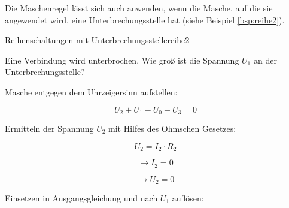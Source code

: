 \begin{frame}
{	Die Maschenregel lässt sich auch anwenden, wenn die Masche, auf die sie angewendet wird, eine Unterbrechungsstelle hat (siehe Beispiel \ref{bsp:reihe2}). 

	\begin{bsp}{Reihenschaltungen mit Unterbrechungsstelle}{reihe2}


		Eine Verbindung wird unterbrochen. Wie groß ist die Spannung $U_1$ an der Unterbrechungsstelle?

		\begin{center}
			
		


\end{center}

Masche entgegen dem Uhrzeigersinn aufstellen:


\begin{equation*}
	U_2+U_1-U_0-U_3 = 0
\end{equation*}

Ermitteln der Spannung $U_2$ mit Hilfes des Ohmschen Gesetzes:


\begin{equation*}
	U_2=I_2 \cdot R_2
\end{equation*}

\begin{equation*}
	\rightarrow I_2 = 0
\end{equation*}

\begin{equation*}
	\rightarrow U_2 = 0
\end{equation*}

Einsetzen in Ausgangsgleichung und nach $U_1$ auflösen:



\end{bsp}}
\end{frame}
